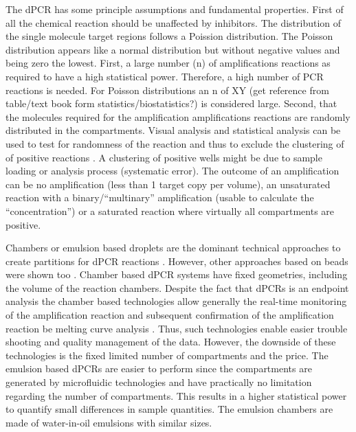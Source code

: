 \documentclass[a4,center,fleqn]{NAR}
\begin{document}
The dPCR has some principle assumptions and fundamental properties. First of all 
the chemical reaction should be unaffected by inhibitors. The distribution of 
the single molecule target regions follows a Poission distribution. The Poisson 
distribution appears like a normal distribution but without negative values and 
being zero the lowest. First, a large number (n) of amplifications reactions as 
required to have a high statistical power. Therefore, a high number of PCR 
reactions is needed. For Poisson distributions an n of XY (get reference from 
table/text book form statistics/biostatistics?) is considered large. Second, that 
the molecules required for the amplification amplifications reactions are 
randomly distributed in the compartments. Visual analysis and statistical 
analysis can be used to test for randomness of the reaction and thus to exclude 
the clustering of of positive reactions \cite{Baddeley_2015}. A 
clustering of positive wells might be due to sample loading or analysis process 
(systematic error). The outcome of an amplification can be no amplification 
(less than 1 target copy per volume), an unsaturated reaction with a 
binary/``multinary'' amplification (usable to calculate the ``concentration'') 
or a saturated reaction where virtually all compartments are positive.

Chambers or emulsion based droplets are the dominant technical approaches to 
create partitions for dPCR  reactions \cite{morley_digital_2014}. However, other 
approaches based on beads were shown too \cite{shuga_single_2013}. Chamber based dPCR 
systems have fixed geometries, including the volume of the reaction chambers. 
Despite the fact that dPCRs is an endpoint analysis the chamber based 
technologies allow generally the real-time monitoring of the amplification 
reaction and subsequent confirmation of the amplification reaction be melting 
curve analysis \cite{mojtahedi_2014}. Thus, such technologies enable easier 
trouble shooting and quality management of the data. However, the downside of 
these technologies is the fixed limited number of compartments and the price. 
The emulsion based dPCRs are easier to perform since the compartments are 
generated by microfluidic technologies and have practically no limitation 
regarding the number of compartments. This results in a higher statistical power 
to quantify small differences in sample quantities. The emulsion chambers are 
made of water-in-oil emulsions with similar sizes.
\end{document}
